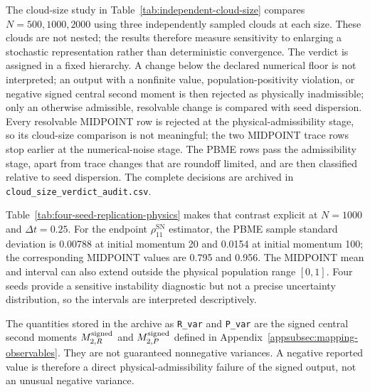 The cloud-size study in Table~\ref{tab:independent-cloud-size} compares
\(N=500,1000,2000\) using three independently sampled clouds at each size.
These clouds are not nested; the results therefore measure sensitivity to
enlarging a stochastic representation rather than deterministic convergence.
The verdict is assigned in a fixed hierarchy. A change below the declared
numerical floor is not interpreted; an output with a nonfinite value,
population-positivity violation, or negative signed central second moment is
then rejected as physically inadmissible; only an otherwise admissible,
resolvable change is compared with seed dispersion. Every resolvable MIDPOINT
row is rejected at the physical-admissibility stage, so its cloud-size
comparison is not meaningful; the two MIDPOINT trace rows stop earlier at the
numerical-noise stage. The PBME rows pass the admissibility stage, apart from
trace changes that are roundoff limited, and are then classified relative to seed
dispersion. The complete decisions are archived in
\texttt{cloud\_size\_verdict\_audit.csv}.

Table~\ref{tab:four-seed-replication-physics} makes that contrast explicit at
\(N=1000\) and \(\Delta t=0.25\). For the endpoint \(\rho_{11}^{\mathrm{SN}}\) estimator, the
PBME sample standard deviation is 0.00788 at initial momentum 20 and 0.0154 at
initial momentum 100; the corresponding MIDPOINT values are 0.795 and 0.956.
The MIDPOINT mean and interval can also extend outside the physical population
range \([0,1]\). Four seeds provide a sensitive instability diagnostic but
not a precise uncertainty distribution, so the intervals are interpreted
descriptively.

The quantities stored in the archive as \texttt{R\_var} and
\texttt{P\_var} are the signed central second moments
\(M^{\rm signed}_{2,R}\) and \(M^{\rm signed}_{2,P}\) defined in
Appendix~\ref{appsubsec:mapping-observables}. They are not guaranteed
nonnegative variances. A negative reported value is therefore a direct
physical-admissibility failure of the signed output, not an unusual negative
variance.

